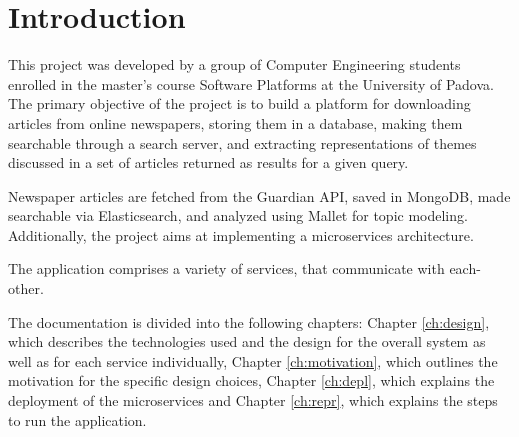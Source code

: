 \section{Introduction}
\label{ch:in}
This project was developed by a group of Computer Engineering students enrolled in the master's
course Software Platforms at the University of Padova. The primary objective of the project is
to build a platform for downloading articles from online newspapers, storing them in a database,
making them searchable through a search server, and extracting representations of themes discussed
in a set of articles returned as results for a given query.

Newspaper articles are fetched from the Guardian API, saved in MongoDB, made searchable via
Elasticsearch, and analyzed using Mallet for topic modeling.
Additionally, the project aims at
implementing a microservices architecture.

The application comprises a variety of services, that communicate with each-other.


The documentation is divided into the following chapters: Chapter \ref{ch:design},
which describes the technologies used and the design for the overall system as well as
for each service individually, Chapter \ref{ch:motivation}, which outlines the motivation
 for the specific design choices, Chapter \ref{ch:depl}, which explains the deployment
 of the microservices and Chapter \ref{ch:repr},
 which explains the steps to run the application.